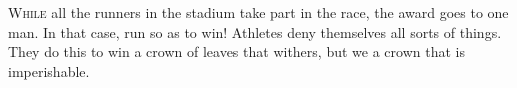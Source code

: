 \lettrine[lines=3,loversize=0.15]{W}{hile} all the runners in the stadium take part in the race, the award goes to one man. In that case, run so as to win! Athletes deny themselves all sorts of things. They do this to win a crown of leaves that withers, but we a crown that is imperishable.
